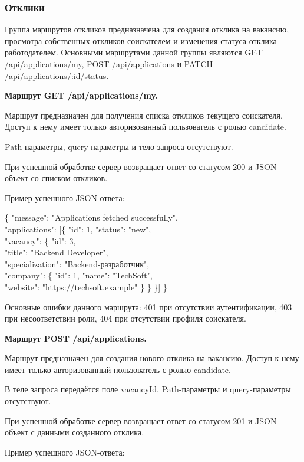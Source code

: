 \subsubsection{Отклики}

Группа маршрутов откликов предназначена для создания отклика на вакансию, просмотра собственных откликов соискателем и изменения статуса отклика работодателем. Основными маршрутами данной группы являются GET /api/applications/my, POST /api/applications и PATCH /api/applications/:id/status.

\textbf{Маршрут GET /api/applications/my.}

Маршрут предназначен для получения списка откликов текущего соискателя. Доступ к нему имеет только авторизованный пользователь с ролью candidate.

Path-параметры, query-параметры и тело запроса отсутствуют.

При успешной обработке сервер возвращает ответ со статусом 200 и JSON-объект со списком откликов.

Пример успешного JSON-ответа:

\begin{flushleft}
	\small\ttfamily
	\{ "message": "Applications fetched successfully",\\
	"applications": [\{ "id": 1, "status": "new",\\
	"vacancy": \{ "id": 3,\\
	"title": "Backend Developer",\\
	"specialization": "Backend-разработчик",\\
	"company": \{ "id": 1, "name": "TechSoft",\\
	"website": "https://techsoft.example" \} \} \}] \}
\end{flushleft}

Основные ошибки данного маршрута: 401 при отсутствии аутентификации, 403 при несоответствии роли, 404 при отсутствии профиля соискателя.

\textbf{Маршрут POST /api/applications.}

Маршрут предназначен для создания нового отклика на вакансию. Доступ к нему имеет только авторизованный пользователь с ролью candidate.

В теле запроса передаётся поле vacancyId. Path-параметры и query-параметры отсутствуют.

При успешной обработке сервер возвращает ответ со статусом 201 и JSON-объект с данными созданного отклика.

Пример успешного JSON-ответа:

